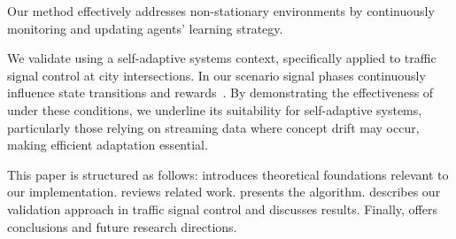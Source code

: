 Our method effectively addresses non-stationary environments by continuously monitoring and 
updating agents' learning strategy. 

We validate \adaptiverl using a self-adaptive systems context, specifically applied to traffic signal 
control at city intersections. In our scenario signal phases continuously influence state transitions 
and rewards~\cite{meta-rl-traffic}. By demonstrating the effectiveness of \adaptiverl under these conditions, we underline its suitability for self-adaptive systems, particularly those relying on streaming data where concept drift may occur, making efficient adaptation essential.

This paper is structured as follows:  introduces theoretical foundations relevant to our implementation.  reviews related work.  presents the \adaptiverl algorithm.  describes our validation approach in traffic signal control and discusses results. Finally,  offers conclusions and future research directions.





\endinput

